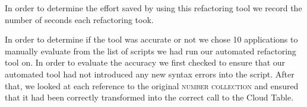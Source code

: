 \documentclass{sigplanconf}
\begin{document}

In order to determine the effort saved by using this refactoring tool we record the number of seconds each refactoring took. 



In order to determine if the tool was accurate or not we chose 10 applications to manually evaluate from the list of scripts we had run our automated refactoring tool on.  In order to evaluate the accuracy we first checked to ensure that our automated tool had not introduced any new syntax errors into the script.  After that, we looked at each reference to the original \textsc{number collection} and ensured that it had been correctly transformed into the correct call to the Cloud Table.
\end{document}
